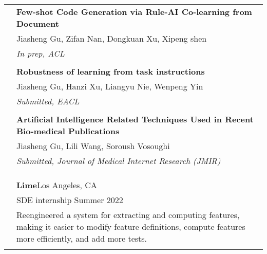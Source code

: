 \documentclass[letterpaper, 11pt]{article}
\begin{document}
\begin{longtable}{p{1.3in}p{4.8in}}

\nohyphens{\color{black}{Publications}}
& \textbf{Few-shot Code Generation via Rule-AI Co-learning from Document} \\
& Jiasheng Gu, Zifan Nan, Dongkuan Xu, Xipeng shen \\
& \textit{In prep, ACL}\\
& \\


& \textbf{Robustness of learning from task instructions} \\
& Jiasheng Gu, Hanzi Xu, Liangyu Nie, Wenpeng Yin \\
& \textit{Submitted, EACL}\\
& \\

& \textbf{Artificial Intelligence Related Techniques Used in Recent Bio-medical Publications} \\
& Jiasheng Gu, Lili Wang, Soroush Vosoughi \\
& \textit{Submitted, Journal of Medical Internet Research (JMIR)}\\
& \\


& \\


& \\


{\color{black}{Industry experience}} 
& {\textbf{Lime}}\hfill Los Angeles, CA \\
& SDE internship \hfill Summer 2022 \\
& Reengineered a system for extracting and computing features, making it easier to modify feature definitions, compute features more efficiently, and add more tests.\\
&\\


\end{longtable}
\end{document}
